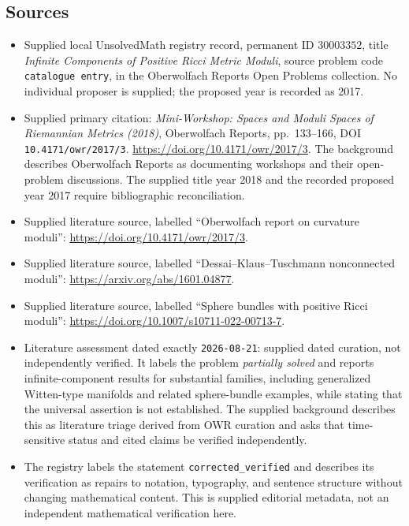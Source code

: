 \documentclass[11pt]{article}
\begin{document}
\subsection{Sources}
\begin{itemize}
\item Supplied local UnsolvedMath registry record, permanent ID \(30003352\), title \emph{Infinite Components of Positive Ricci Metric Moduli}, source problem code \texttt{catalogue entry}, in the Oberwolfach Reports Open Problems collection. No individual proposer is supplied; the proposed year is recorded as 2017.
\item Supplied primary citation: \emph{Mini-Workshop: Spaces and Moduli Spaces of Riemannian Metrics (2018)}, Oberwolfach Reports, pp.\ 133--166, DOI \texttt{10.4171/owr/2017/3}. \url{https://doi.org/10.4171/owr/2017/3}. The background describes Oberwolfach Reports as documenting workshops and their open-problem discussions. The supplied title year 2018 and the recorded proposed year 2017 require bibliographic reconciliation.
\item Supplied literature source, labelled ``Oberwolfach report on curvature moduli'': \url{https://doi.org/10.4171/owr/2017/3}.
\item Supplied literature source, labelled ``Dessai--Klaus--Tuschmann nonconnected moduli'': \url{https://arxiv.org/abs/1601.04877}.
\item Supplied literature source, labelled ``Sphere bundles with positive Ricci moduli'': \url{https://doi.org/10.1007/s10711-022-00713-7}.
\item Literature assessment dated exactly \texttt{2026-08-21}: supplied dated curation, not independently verified. It labels the problem \emph{partially solved} and reports infinite-component results for substantial families, including generalized Witten-type manifolds and related sphere-bundle examples, while stating that the universal assertion is not established. The supplied background describes this as literature triage derived from OWR curation and asks that time-sensitive status and cited claims be verified independently.
\item The registry labels the statement \texttt{corrected\_verified} and describes its verification as repairs to notation, typography, and sentence structure without changing mathematical content. This is supplied editorial metadata, not an independent mathematical verification here.
\end{itemize}
\end{document}
